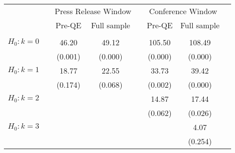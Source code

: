 \begin{tabular}{cccccccc}
 &  &  &  &  &  &  &  \\
\midrule 
 &  & \multicolumn{2}{c}{Press Release Window} &  & \multicolumn{2}{c}{Conference Window} &  \\
\midrule 
 &  & Pre-QE & Full sample &  & Pre-QE & Full sample \\
\cmidrule{3-4} \cmidrule{6-7}  &  &  &  &  &  &  &  \\
$H_{0}:k=0$ &  & 46.20 & 49.12 &  & 105.50 & 108.49 &  \\
 &  & (0.001) & (0.000) &  & (0.000) & (0.000) &  \\
$H_{0}:k=1$ &  & 18.77 & 22.55 &  & 33.73 & 39.42 &  \\
 &  & (0.174) & (0.068) &  & (0.002) & (0.000) &  \\
$H_{0}:k=2$ &  &  &  &  & 14.87 & 17.44 &  \\
 &  &  &  &  & (0.062) & (0.026) &  \\
$H_{0}:k=3$ &  &  &  &  &  & 4.07 &  \\
 &  &  &  &  &  & (0.254) &  \\
\bottomrule 
\end{tabular}
